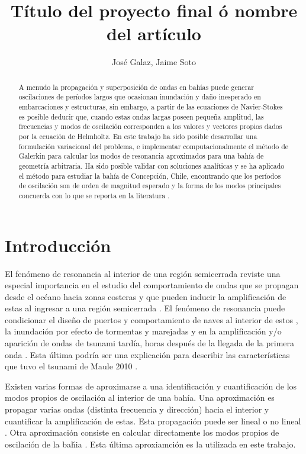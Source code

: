 \documentclass[12pt, letterpaper]{article}
\title{T\'itulo del proyecto final \'o nombre del art\'iculo}
\author{Jos\'e Galaz, Jaime Soto}
\date{}
\begin{document}
\maketitle

\begin{abstract}
    A menudo la propagaci\'on y superposici\'on de ondas en bah\'ias puede generar oscilaciones de per\'iodos largos que ocasionan inundaci\'on y da\~no inesperado en embarcaciones y estructuras, sin embargo, a partir de las ecuaciones de Navier-Stokes es posible deducir que, cuando estas ondas largas poseen pequeña amplitud, las frecuencias y modos de oscilación corresponden a los valores y vectores propios dados por la ecuación de Helmholtz. En este trabajo ha sido posible desarrollar una formulación variacional del problema, e implementar computacionalmente el método de Galerkin para calcular los modos de resonancia aproximados para una bah\'ia de geometría arbitraria. Ha sido posible validar con soluciones anal\'iticas y se ha aplicado el método para estudiar la bah\'ia de Concepción, Chile, encontrando que los períodos de oscilación son de orden de magnitud esperado y la forma de los modos principales concuerda con lo que se reporta en la literatura \cite{Belloti2012}.
\end{abstract}

\section{Introducci\'on}

El fen\'omeno de resonancia al interior de una regi\'on  semicerrada reviste una especial importancia en el estudio del comportamiento de ondas que se propagan desde el oc\'eano hacia zonas costeras y que pueden inducir la amplificaci\'on de estas al ingresar a una regi\'on semicerrada \cite{Kowalik1993}. El fen\'omeno de resonancia puede condicionar el diseño de puertos y comportamiento de naves al interior de estos \cite{Diaz2006web}, la inundaci\'on por efecto de tormentas y marejadas \cite{Kowalik1993} y en la amplificaci\'on y/o aparici\'on de ondas de tsunami tard\'ia, horas despu\'es de la llegada de la primera onda \cite{Kowalik1993}. Esta \'ultima podría ser una explicaci\'on para describir las caracter\'isticas que tuvo el tsunami de Maule 2010 \cite{Cyper2012web}.

Existen varias formas de aproximarse a una identificaci\'on y cuantificaci\'on de los modos propios de oscilaci\'on al interior de una bah\'ia. Una aproximaci\'on es propagar varias ondas (distinta frecuencia y direcci\'on) hacia el interior y cuantificar la amplificaci\'on de estas. Esta propagaci\'on puede ser lineal o no lineal \cite{Mei2005}. Otra aproximaci\'on consiste en calcular directamente los modos propios de oscilaci\'on de la ba\'hia \cite{Belloti2012, Mei2005}. Esta \'ultima aproxiamci\'on es la utilizada en este trabajo.
\end{document}
